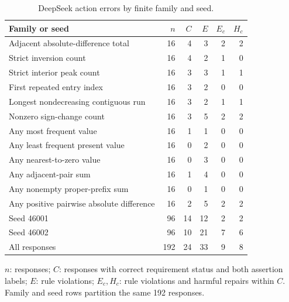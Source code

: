 \begin{table}[t]
\centering
\small
\caption{DeepSeek action errors by finite family and seed.}
\label{tab:s_action_strata}
\begin{tabular}{lrrrrr}
\toprule
Family or seed & $n$ & $C$ & $E$ & $E_c$ & $H_c$ \\
\midrule
Adjacent absolute-difference total & 16 & 4 & 3 & 2 & 2 \\
Strict inversion count & 16 & 4 & 2 & 1 & 0 \\
Strict interior peak count & 16 & 3 & 3 & 1 & 1 \\
First repeated entry index & 16 & 3 & 2 & 0 & 0 \\
Longest nondecreasing contiguous run & 16 & 3 & 2 & 1 & 1 \\
Nonzero sign-change count & 16 & 3 & 5 & 2 & 2 \\
Any most frequent value & 16 & 1 & 1 & 0 & 0 \\
Any least frequent present value & 16 & 0 & 2 & 0 & 0 \\
Any nearest-to-zero value & 16 & 0 & 3 & 0 & 0 \\
Any adjacent-pair sum & 16 & 1 & 4 & 0 & 0 \\
Any nonempty proper-prefix sum & 16 & 0 & 1 & 0 & 0 \\
Any positive pairwise absolute difference & 16 & 2 & 5 & 2 & 2 \\
Seed 46001 & 96 & 14 & 12 & 2 & 2 \\
Seed 46002 & 96 & 10 & 21 & 7 & 6 \\
All responses & 192 & 24 & 33 & 9 & 8 \\
\bottomrule
\end{tabular}
\par\smallskip
\begin{minipage}{\linewidth}
\footnotesize
$n$: responses; $C$: responses with correct requirement status and both assertion labels; $E$: rule violations; $E_c,H_c$: rule violations and harmful repairs within $C$. Family and seed rows partition the same 192 responses.
\end{minipage}
\end{table}
